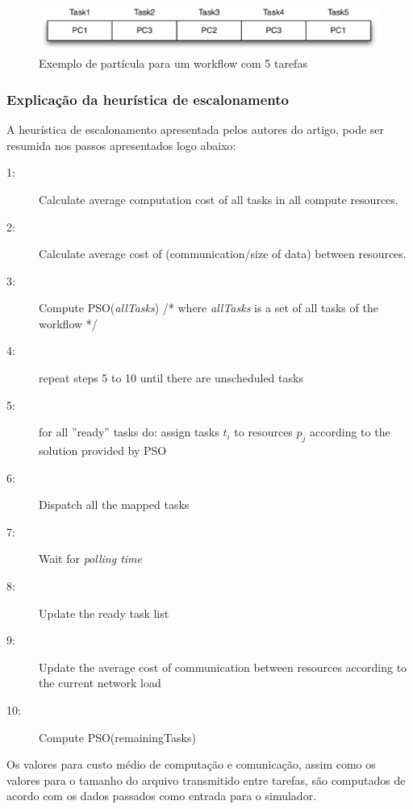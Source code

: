 \documentclass[a4paper,10pt]{article}
\begin{document}
\begin{figure}[!htb]
\centering
\includegraphics[scale=.5]{figures/fig1.eps}
\caption{Exemplo de partícula para um workflow com 5 tarefas}
\label{particula}
\end{figure}

\subsubsection{Explicação da heurística de escalonamento}

A heurística de escalonamento apresentada pelos autores do artigo, pode ser resumida nos passos
apresentados logo abaixo:\\

\begin{description}
\item[1:] Calculate average computation cost of all tasks in all compute resources.
\item[2:] Calculate average cost of (communication/size of data) between resources.
\item[3:] Compute PSO(\emph{allTasks}) /* where \emph{allTasks} is a set of all tasks of the workflow */
\item[4:] repeat steps 5 to 10 until there are unscheduled tasks
\item[5:] for all ''ready'' tasks do: assign tasks $t_{i}$ to resources $p_{j}$ according to the solution provided by PSO
\item[6:] Dispatch all the mapped tasks
\item[7:] Wait for \emph{polling time}
\item[8:] Update the ready task list
\item[9:] Update the average cost of communication between resources according to the current network load
\item[10:] Compute PSO(remainingTasks)
\end{description}

Os valores para custo médio de computação e comunicação, assim como os valores para o tamanho 
do arquivo transmitido entre tarefas, são computados de acordo com os dados passados como entrada para o simulador.\\
\end{document}
